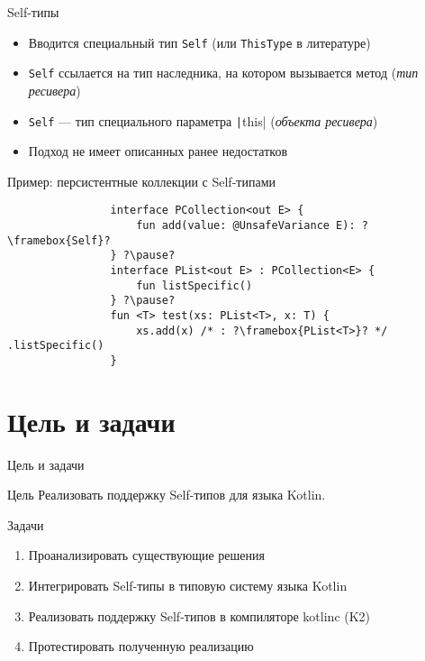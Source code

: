 \documentclass[aspectratio=169,usenames,dvipsnames]{beamer}
\begin{document}
    \begin{frame}[fragile]{Self-типы}

        \begin{itemize}
            \item Вводится специальный тип \texttt{Self} (или \texttt{ThisType} в литературе)
            \item \texttt{Self} ссылается на тип наследника, на котором вызывается метод (\emph{тип ресивера})
            \item \texttt{Self} --- тип специального параметра \texttt|this| (\emph{объекта ресивера})
            \item Подход не имеет описанных ранее недостатков
        \end{itemize}

        \pause

        \begin{block}{Пример: персистентные коллекции с Self-типами}
            \begin{verbatim}
                interface PCollection<out E> {
                    fun add(value: @UnsafeVariance E): ?\framebox{Self}?
                } ?\pause?
                interface PList<out E> : PCollection<E> {
                    fun listSpecific()
                } ?\pause?
                fun <T> test(xs: PList<T>, x: T) {
                    xs.add(x) /* : ?\framebox{PList<T>}? */ .listSpecific()
                }
            \end{verbatim}
        \end{block}
    \end{frame}


    \section{Цель и задачи}

    \begin{frame}[fragile]{Цель и задачи}

        \begin{block}{Цель}
            Реализовать поддержку Self-типов для языка Kotlin.
        \end{block}

        \begin{block}{Задачи}
            \begin{enumerate}
                \item Проанализировать существующие решения
                \item Интегрировать Self-типы в типовую систему языка Kotlin
                \item Реализовать поддержку Self-типов в компиляторе kotlinc (K2)
                \item Протестировать полученную реализацию
            \end{enumerate}
        \end{block}
    \end{frame}
\end{document}
